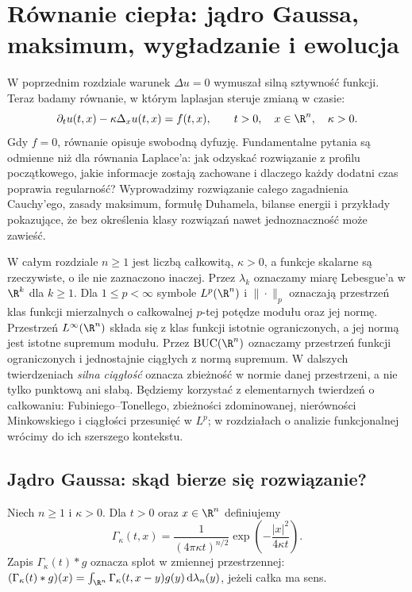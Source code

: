 \chapter[Równanie ciepła]{Równanie ciepła: jądro Gaussa, maksimum, wygładzanie i ewolucja}
\label{chap:pde-heat}

W poprzednim rozdziale warunek $\Delta u=0$ wymuszał silną
sztywność funkcji. Teraz badamy równanie, w którym laplasjan
steruje zmianą w czasie:
\begin{equation}\label{eq:pde4-heat}
 \partial_tu(t,x)-\kappa\Delta_xu(t,x)=f(t,x),\qquad
 t>0,\quad x\in\R^n,\quad \kappa>0.
\end{equation}
Gdy $f=0$, równanie opisuje swobodną dyfuzję. Fundamentalne pytania
są odmienne niż dla równania Laplace'a: jak odzyskać rozwiązanie
z profilu początkowego, jakie informacje zostają zachowane i dlaczego
każdy dodatni czas poprawia regularność? Wyprowadzimy rozwiązanie
całego zagadnienia Cauchy'ego, zasady maksimum, formułę Duhamela,
bilanse energii i przykłady pokazujące, że bez określenia klasy
rozwiązań nawet jednoznaczność może zawieść.

W całym rozdziale $n\geq1$ jest liczbą całkowitą,
$\kappa>0$, a funkcje skalarne są rzeczywiste, o ile
nie zaznaczono inaczej. Przez $\lambda_k$ oznaczamy
miarę Lebesgue'a w $\R^k$ dla $k\geq1$.
Dla $1\leq p<\infty$ symbole $L^p(\R^n)$ i $\|\cdot\|_p$
oznaczają przestrzeń klas funkcji mierzalnych
o całkowalnej $p$-tej potędze modułu oraz jej normę.
Przestrzeń $L^\infty(\R^n)$ składa się z klas funkcji
istotnie ograniczonych, a jej normą jest istotne
supremum modułu. Przez $\mathrm{BUC}(\R^n)$ oznaczamy
przestrzeń funkcji ograniczonych i jednostajnie
ciągłych z normą supremum. W dalszych twierdzeniach
\emph{silna ciągłość} oznacza zbieżność w normie danej
przestrzeni, a nie tylko punktową ani słabą. Będziemy korzystać z elementarnych
twierdzeń o całkowaniu: Fubiniego--Tonellego, zbieżności
zdominowanej, nierówności Minkowskiego i ciągłości przesunięć
w $L^p$; w rozdziałach o analizie funkcjonalnej wrócimy
do ich szerszego kontekstu.

\section{Jądro Gaussa: skąd bierze się rozwiązanie?}
\label{sec:pde4-gauss}

\begin{definicja}
\label{def:pde4-kernel}
Niech $n\geq1$ i $\kappa>0$. Dla $t>0$ oraz $x\in\R^n$
definiujemy
\begin{equation}\label{eq:pde4-kernel}
 \Gamma_\kappa(t,x)=\frac{1}{(4\pi\kappa t)^{n/2}}
 \exp\!\left(-\frac{|x|^2}{4\kappa t}\right).
\end{equation}
Zapis $\Gamma_\kappa(t)*g$ oznacza splot w zmiennej przestrzennej:
$(\Gamma_\kappa(t)*g)(x)=\int_{\R^n}\Gamma_\kappa(t,x-y)g(y)
\,\mathrm d\lambda_n(y)$, jeżeli całka ma sens.
\end{definicja}

